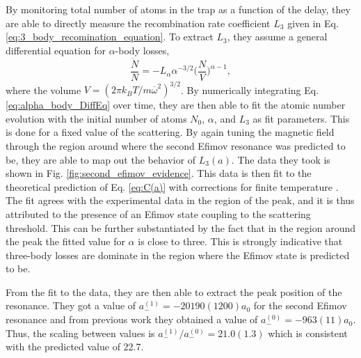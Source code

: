\documentclass[prl,onecolumn,amsmath,amssymb,titlepage,nofootinbib,preprint]{revtex4-1}
\begin{document}
	 By monitoring total number of atoms in the trap as a function of the delay, they are able to directly measure the recombination rate coefficient $L_{3}$ given in Eq. \ref{eq:3_body_recomination_equation}.  To extract $L_{3}$, they assume a general differential equation for $\alpha$-body losses,
	 	\begin{equation}\label{eq:alpha_body_DiffEq}
	 		\frac{\dot{N}}{N}=-L_{\alpha}\alpha^{-3/2}\bigg(\frac{N}{V}\bigg)^{\alpha-1},
	 	\end{equation}
	where the volume $V=(2\pi k_{B}T/m\overline{\omega}^{2})^{3/2}$.  By numerically integrating Eq. \ref{eq:alpha_body_DiffEq} over time, they are then able to fit the atomic number evolution with the initial number of atoms $N_{0}$, $\alpha$, and $L_{3}$ as fit parameters.  This is done for a fixed value of the scattering.  By again tuning the magnetic field through the region around where the second Efimov resonance was predicted to be, they are able to map out the behavior of $L_{3}(a)$.  The data they took is shown in Fig. \ref{fig:second_efimov_evidence}.  This data is then fit to the theoretical prediction of Eq. \ref{eq:C(a)} with corrections for finite temperature \cite{Rem2013}.  The fit agrees with the experimental data in the region of the peak, and it is thus attributed to the presence of an Efimov state coupling to the scattering threshold.  This can be further substantiated by the fact that in the region around the peak the fitted value for $\alpha$ is close to three.  This is strongly indicative that three-body losses are dominate in the region where the Efimov state is predicted to be.  
	
	From the fit to the data, they are then able to extract the peak position of the resonance.  They got a value of $a^{(1)}_{-}=-20190(1200)a_{0}$ for the second Efimov resonance and from previous work they obtained a value of $a^{(0)}_{-}=-963(11)a_{0}$.  Thus, the scaling between values is $a^{(1)}_{-}/a^{(0)}_{-}=21.0(1.3)$ which is consistent with the predicted value of 22.7.
	
	
	
	

\end{document}
